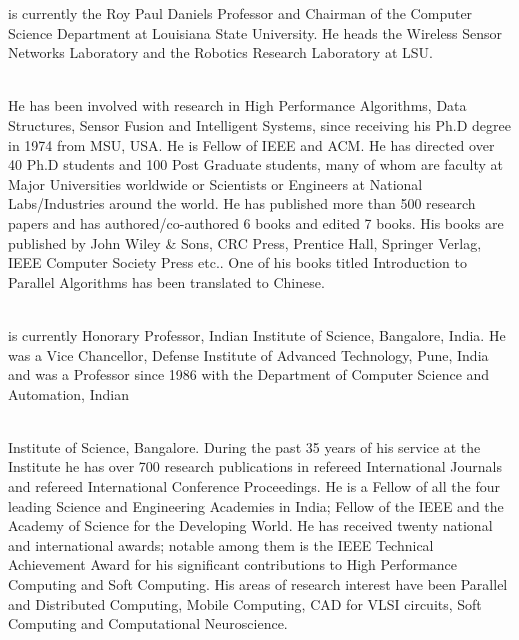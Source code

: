 \documentclass[fleqn,twoside]{article}
\begin{document}
\begin{minipage}[b][1in][c]{1.8in}
{ is currently the Roy Paul Daniels Professor and Chairman of the Computer Science Department at Louisiana State University. He heads the Wireless Sensor Networks Laboratory and the Robotics Research Laboratory at LSU.}\\\\
\end{minipage}
He has been involved with research in High Performance Algorithms, Data Structures, Sensor Fusion and Intelligent Systems, since receiving his Ph.D degree in 1974 from MSU, USA. He is Fellow of IEEE and ACM. He has directed over 40 Ph.D students and 100 Post Graduate students, many of whom are faculty at Major Universities worldwide or Scientists or Engineers at National Labs/Industries around the world. He has published more than 500 research papers and has authored/co-authored 6 books and edited 7 books. His books are published by John Wiley \& Sons, CRC Press, Prentice Hall, Springer Verlag, IEEE Computer Society Press etc.. One of his books titled Introduction to Parallel Algorithms has been translated to Chinese.\\\\

\begin{minipage}[b][1in][c]{1.8in}
{ is currently Honorary Professor, Indian Institute of Science, Bangalore, India. He was a Vice Chancellor, Defense Institute of Advanced Technology, Pune, India and was a Professor since 1986 with the Department of Computer Science and Automation, Indian} \\ \\
\end{minipage}
Institute of Science, Bangalore. During the past 35 years of his service at the Institute he has over 700 research publications in refereed International Journals and refereed International Conference Proceedings. He is a Fellow of all the four leading Science and Engineering Academies in India;  Fellow of the IEEE and the Academy of Science for the Developing World. He has received twenty national and international awards; notable among them is the IEEE Technical Achievement Award for his significant  contributions to High Performance Computing and Soft Computing. His areas of research interest have been Parallel and Distributed Computing, Mobile Computing, CAD for VLSI circuits, Soft Computing and Computational Neuroscience.
\balance
\end{document}
